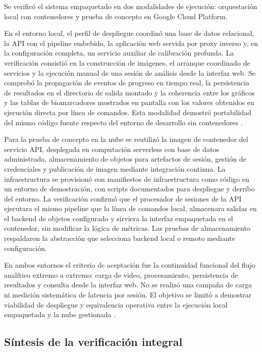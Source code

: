 Se verificó el sistema empaquetado en dos modalidades de ejecución: orquestación local con contenedores y prueba de concepto en Google Cloud Platform.

En el entorno local, el perfil de despliegue coordinó una base de datos relacional, la API con el pipeline embebido, la aplicación web servida por proxy inverso y, en la configuración completa, un servicio auxiliar de calibración profunda. La verificación consistió en la construcción de imágenes, el arranque coordinado de servicios y la ejecución manual de una sesión de análisis desde la interfaz web. Se comprobó la propagación de eventos de progreso en tiempo real, la persistencia de resultados en el directorio de salida montado y la coherencia entre los gráficos y las tablas de biomarcadores mostrados en pantalla con los valores obtenidos en ejecución directa por línea de comandos. Esta modalidad demostró portabilidad del mismo código fuente respecto del entorno de desarrollo sin contenedores \citep{merkel2014docker}.

Para la prueba de concepto en la nube se reutilizó la imagen de contenedor del servicio API, desplegada en computación serverless con base de datos administrada, almacenamiento de objetos para artefactos de sesión, gestión de credenciales y publicación de imagen mediante integración continua. La infraestructura se provisionó con manifiestos de infraestructura como código en un entorno de demostración, con scripts documentados para despliegue y derribo del entorno. La verificación confirmó que el procesador de sesiones de la API ejecutara el mismo pipeline que la línea de comandos local, almacenara salidas en el backend de objetos configurado y sirviera la interfaz empaquetada en el contenedor, sin modificar la lógica de métricas. Las pruebas de almacenamiento respaldaron la abstracción que selecciona backend local o remoto mediante configuración.

En ambos entornos el criterio de aceptación fue la continuidad funcional del flujo analítico extremo a extremo: carga de video, procesamiento, persistencia de resultados y consulta desde la interfaz web. No se realizó una campaña de carga ni medición sistemática de latencia por sesión. El objetivo se limitó a demostrar viabilidad de despliegue y equivalencia operativa entre la ejecución local empaquetada y la nube gestionada \citep{gcp}.

\subsection{Síntesis de la verificación integral}

